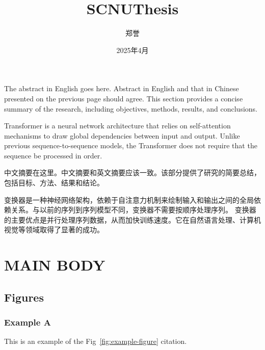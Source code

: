 \documentclass{NEXT-SCNUThesis}
\title{SCNUThesis}
\author{郑誉}
\date{2025年4月}
\begin{document}
    \maketitle

    \begin{abstracten}
        The abstract in English goes here. Abstract in English and that in
        Chinese presented on the previous page should agree. This section provides
        a concise summary of the research, including objectives, methods,
        results, and conclusions.

        Transformer is a neural network architecture that relies on self-attention
        mechanisms to draw global dependencies between input and output. Unlike
        previous sequence-to-sequence models, the Transformer does not require that
        the sequence be processed in order.
    \end{abstracten}

    \begin{abstractzh}
        中文摘要在这里。中文摘要和英文摘要应该一致。该部分提供了研究的简要总结，包括目标、方法、结果和结论。

        变换器是一种神经网络架构，依赖于自注意力机制来绘制输入和输出之间的全局依赖关系。与以前的序列到序列模型不同，变换器不需要按顺序处理序列。
        变换器的主要优点是并行处理序列数据，从而加快训练速度。它在自然语言处理、计算机视觉等领域取得了显著的成功。
    \end{abstractzh}

    \toc

    \chapter{MAIN BODY}

    \section{Figures}
    \subsection{Example A}
    This is an example of the Fig~\ref{fig:example-figure} citation.
\end{document}
